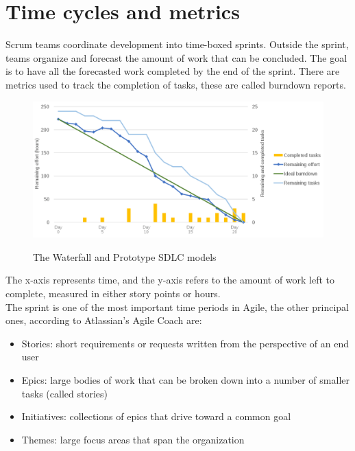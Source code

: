 \section{Time cycles and metrics}
	Scrum teams coordinate development into time-boxed sprints.
	Outside the sprint, teams organize and forecast the amount of work that can be concluded.
	The goal is to have all the forecasted work completed by the end of the sprint.
	There are metrics used to track the completion of tasks, these are called burndown reports.
	\begin{figure}[H]
		\centering
		\includegraphics[width=\textwidth]{resources/burndown}\\
		\caption{The Waterfall and Prototype SDLC models}
	\end{figure}
	The x-axis represents time, and the y-axis refers to the amount of work left to complete, measured in either story points or hours.\\
	The sprint is one of the most important time periods in Agile, the other principal ones, according to Atlassian's Agile Coach\cite{epics-stories-themes} are:
	\begin{itemize}
		\item Stories: short requirements or requests written from the perspective of an end user
		\item Epics: large bodies of work that can be broken down into a number of smaller tasks (called stories)
		\item Initiatives: collections of epics that drive toward a common goal
		\item Themes: large focus areas that span the organization
	\end{itemize}
